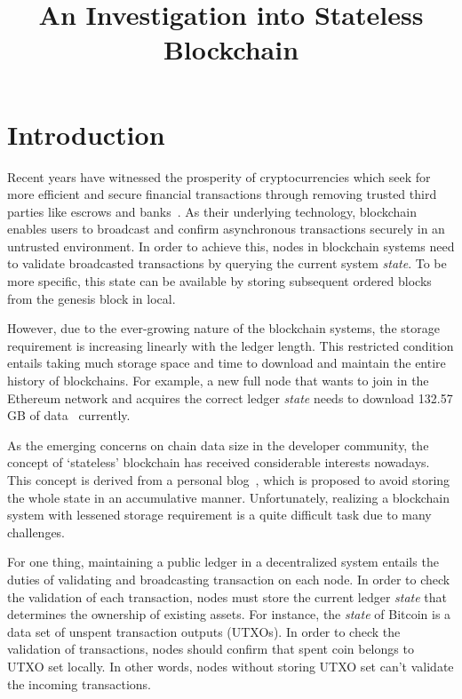\documentclass[conference]{IEEEtran}
\begin{document}
\title{An Investigation into Stateless Blockchain}

\author{
}

\maketitle


\section{Introduction}
Recent years have witnessed the prosperity of cryptocurrencies which seek for more efficient and secure financial
transactions through removing trusted third parties like escrows and banks~\cite{SongWP00}.
%
As their underlying technology, blockchain enables users to broadcast and confirm asynchronous transactions securely in an untrusted environment.
%
In order to achieve this, nodes in blockchain systems need to validate broadcasted transactions by querying the current system \textit{state}.
%
To be more specific, this state can be available by storing subsequent ordered blocks from the genesis block in local.

However, due to the ever-growing nature of the blockchain systems, the storage requirement is increasing linearly with the ledger length.
%
This restricted condition entails taking much storage space and time to download and maintain the entire history of blockchains.
%
For example, a new full node that wants to join in the Ethereum network and acquires the correct ledger \textit{state} needs to download 132.57 GB of data~\cite{Ethereumstorage} currently. 

As the emerging concerns on chain data size in the developer community, the concept of `stateless' blockchain has received considerable interests nowadays.
%
This concept is derived from a personal blog~\cite{delayed-txo-commitments}, which is proposed to avoid storing the whole state in an accumulative manner.
%
Unfortunately, realizing a blockchain system with lessened storage requirement is a quite difficult task due to many challenges.

For one thing, maintaining a public ledger in a decentralized system entails the duties of validating and broadcasting transaction on each node.
%
In order to check the validation of each transaction, nodes must store the current ledger \textit{state} that determines the ownership of existing assets.
%
For instance, the \textit{state} of Bitcoin is a data set of unspent transaction outputs (UTXOs). 
%
In order to check the validation of transactions, nodes should confirm that spent coin belongs to UTXO set locally.
%
In other words, nodes without storing UTXO set can't validate the incoming transactions.
\end{document}

